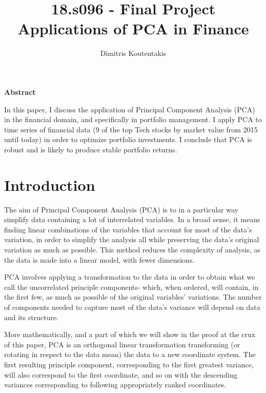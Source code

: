 \documentclass{article}
\begin{document}
\title{\vspace{-0.0in}\hspace{+0.5in}18.s096 - Final Project \\
Applications of PCA in Finance}
\author{Dimitris Koutentakis}
\date{}


\maketitle



\textbf{ Abstract} 
\vspace{2mm}

In this paper, I discuss the application of Principal Component Analysis (PCA) in the financial domain, and specifically in portfolio management. I apply PCA to time series of financial data (9 of the top Tech stocks by market value from 2015 until today) in order to optimize portfolio investments. I conclude that PCA is robust and is likely to produce stable portfolio returns.

\section{Introduction}
The aim of Principal Component Analysis (PCA) is to in a particular way simplify data containing a lot of interrelated variables. In a broad sense, it means finding linear combinations of the variables that account for most of the data's variation, in order to simplify the analysis all while preserving the data's original variation as much as possible. This method reduces the complexity of analysis, as the data is made into a linear model, with fewer dimensions.

PCA involves applying a transformation to the data in order to obtain what we call the uncorrelated principle components- which, when ordered, will contain, in the first few, as much as possible of the original variables' variations. The number of components needed to capture most of the data's variance will depend on data and its structure.

More mathematically, and a part of which we will show in the proof at the crux of this paper, PCA is an orthogonal linear transformation transforming (or rotating in respect to the data mean) the data to a new coordinate system. 
The first resulting principle component, corresponding to the first greatest variance, will also correspond to the first coordinate, and so on with the descending variances corresponding to following appropriately ranked coordinates.
\end{document}
